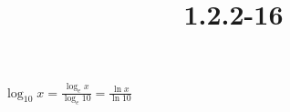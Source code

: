 \documentclass{article}
\title{1.2.2-16}
\begin{document}
\maketitle

\( \log_{10}{x} = \frac{\log_e{x}}{\log_e{10}} = \frac{\ln{x}}{\ln{10}} \)
\end{document}
